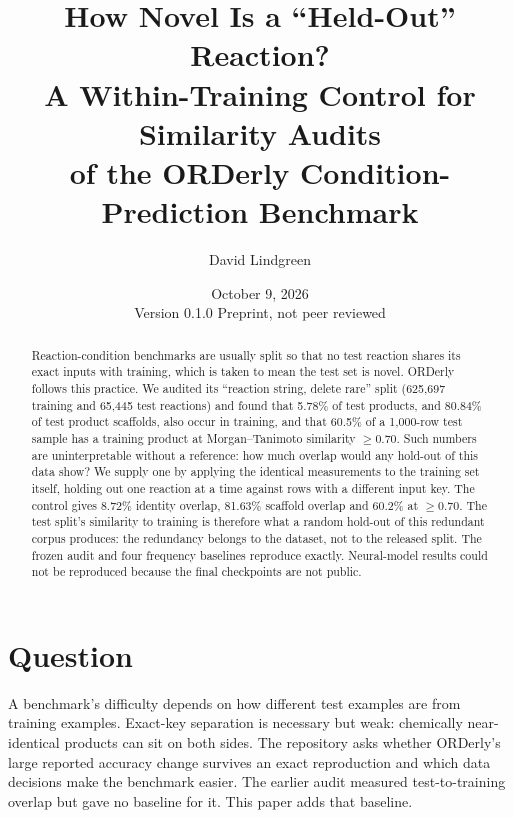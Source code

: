 \documentclass[11pt]{article}
\title{How Novel Is a ``Held-Out'' Reaction?\\
A Within-Training Control for Similarity Audits\\
of the ORDerly Condition-Prediction Benchmark}
\author{David Lindgreen}
\date{October 9, 2026 \\[2pt] \small Version 0.1.0 \quad Preprint, not peer reviewed}
\begin{document}
\maketitle

\begin{abstract}
Reaction-condition benchmarks are usually split so that no test reaction shares its exact inputs with training, which is taken to
mean the test set is novel. ORDerly~\cite{wigh2024} follows this practice. We audited its ``reaction string, delete rare'' split
(625{,}697 training and 65{,}445 test reactions) and found that 5.78\% of test products, and 80.84\% of test product scaffolds,
also occur in training, and that 60.5\% of a 1{,}000-row test sample has a training product at Morgan--Tanimoto similarity
$\ge 0.70$. Such numbers are uninterpretable without a reference: how much overlap would any hold-out of this data show? We supply one
by applying the identical measurements to the training set itself, holding out one reaction at a time against rows with a different
input key. The control gives 8.72\% identity overlap, 81.63\% scaffold overlap and 60.2\% at $\ge0.70$. The test split's
similarity to training is therefore what a random hold-out of this redundant corpus produces: the redundancy belongs to the dataset,
not to the released split. The frozen audit and four frequency baselines reproduce exactly. Neural-model results could not be
reproduced because the final checkpoints are not public.
\end{abstract}

\section{Question}
A benchmark's difficulty depends on how different test examples are from training examples. Exact-key separation is necessary but weak:
chemically near-identical products can sit on both sides. The repository asks whether ORDerly's large reported accuracy change
survives an exact reproduction and which data decisions make the benchmark easier. The earlier audit measured test-to-training
overlap but gave no baseline for it. This paper adds that baseline.
\end{document}
